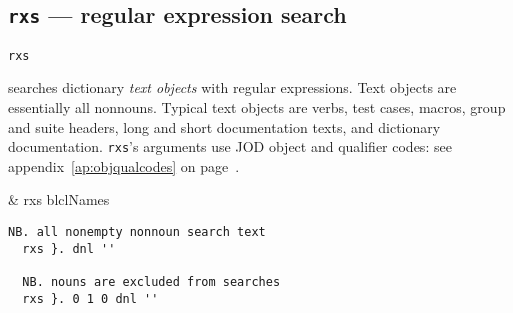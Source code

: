 \subsection{\texttt{rxs} --- regular expression search}\label{ss:rxs}

\hypertarget{il:rxs}{\texttt{rxs}} searches dictionary \emph{text objects} with regular expressions.
Text objects are essentially all nonnouns.  Typical text objects are verbs, test cases, macros,  group and suite headers, 
long and short documentation texts, and dictionary documentation.
\texttt{rxs}'s arguments use JOD object and qualifier codes: see appendix~\ref{ap:objqualcodes} on
page~\pageref{ap:objqualcodes}.

\begin{wordhead}
\monad & rxs blclNames \\
\end{wordhead}
\begin{lstlisting}[frame=single,framerule=0pt]
  NB. all nonempty nonnoun search text
  rxs }. dnl ''  
  
  NB. nouns are excluded from searches
  rxs }. 0 1 0 dnl ''  
\end{lstlisting}  


